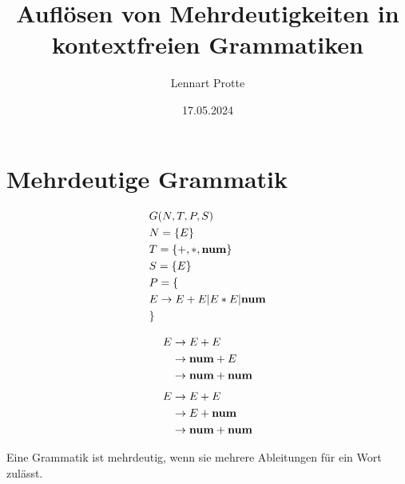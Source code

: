 \documentclass[t]{beamer}
\begin{document}

	\title{Auflösen von Mehrdeutigkeiten in kontextfreien Grammatiken}
	\date{17.05.2024}
	\author{Lennart Protte}

	\frame{\titlepage}


	\section{Mehrdeutige Grammatik}\label{sec:mehrdeutige-grammatik}
	\begin{frame}
		\begin{minipage}[c]{0.5\textwidth}
			\centering
			\begin{align*}
				& G(N,T,P,S) \\
				& N= \{E\} \\
				& T= \{+, *, \bold{num}\} \\
				& S= \{E\}  \\
				& P = \{ \\
				& E \rightarrow E + E | E * E | \bold{num} \\
				& \}
			\end{align*}
		\end{minipage}\begin{minipage}[c]{0.5\textwidth}
			              \begin{align*}
				              & E \rightarrow E + E \\
				              & \phantom{E} \rightarrow \bold{num} + E \\
				              & \phantom{E} \rightarrow \bold{num} + \bold{num} \\
			              \end{align*}
			              \begin{align*}
				              & E \rightarrow E + E \\
				              & \phantom{E} \rightarrow E + \bold{num} \\
				              & \phantom{E} \rightarrow \bold{num} + \bold{num} \\
			              \end{align*}
		\end{minipage}
		Eine Grammatik ist mehrdeutig, wenn sie mehrere Ableitungen für ein Wort zulässt.
	\end{frame}
\end{document}

